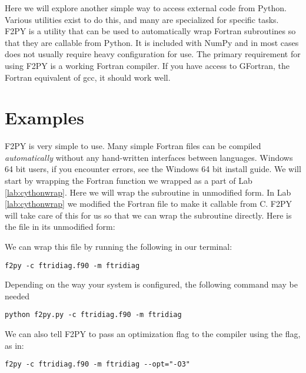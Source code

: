 \label{lab:f2py}

Here we will explore another simple way to access external code from Python.
Various utilities exist to do this, and many are specialized for specific tasks.
F2PY is a utility that can be used to automatically wrap Fortran subroutines so that they are callable from Python.
It is included with NumPy and in most cases does not usually require heavy configuration for use.
The primary requirement for using F2PY is a working Fortran compiler.
If you have access to GFortran, the Fortran equivalent of gcc, it should work well.

\section*{Examples}

F2PY is very simple to use.
Many simple Fortran files can be compiled \emph{automatically} without any hand-written interfaces between languages.
Windows 64 bit users, if you encounter errors, see the Windows 64 bit install guide.
We will start by wrapping the Fortran function we wrapped as a part of Lab \ref{lab:cythonwrap}.
Here we will wrap the subroutine in unmodified form.
In Lab \ref{lab:cythonwrap} we modified the Fortran file to make it callable from C.
F2PY will take care of this for us so that we can wrap the subroutine directly.
Here is the file in its unmodified form:

We can wrap this file by running the following in our terminal:
\begin{lstlisting}[style=ShellInput]
f2py -c ftridiag.f90 -m ftridiag
\end{lstlisting}
Depending on the way your system is configured, the following command may be needed
\begin{lstlisting}[style=ShellInput]
python f2py.py -c ftridiag.f90 -m ftridiag
\end{lstlisting}
We can also tell F2PY to pass an optimization flag to the compiler using the  flag, as in:
\begin{lstlisting}[style=ShellInput]
f2py -c ftridiag.f90 -m ftridiag --opt="-O3"
\end{lstlisting}

